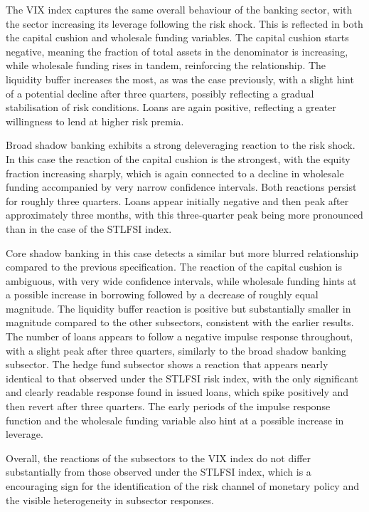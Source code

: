 \documentclass[12pt,a4paper]{report}
\begin{document}
The VIX index captures the same overall behaviour of the banking sector, with the sector increasing its leverage following the risk shock. This is reflected in both the capital cushion and wholesale funding variables. The capital cushion starts negative, meaning the fraction of total assets in the denominator is increasing, while wholesale funding rises in tandem, reinforcing the relationship. The liquidity buffer increases the most, as was the case previously, with a slight hint of a potential decline after three quarters, possibly reflecting a gradual stabilisation of risk conditions. Loans are again positive, reflecting a greater willingness to lend at higher risk premia.

Broad shadow banking exhibits a strong deleveraging reaction to the risk shock. In this case the reaction of the capital cushion is the strongest, with the equity fraction increasing sharply, which is again connected to a decline in wholesale funding accompanied by very narrow confidence intervals. Both reactions persist for roughly three quarters. Loans appear initially negative and then peak after approximately three months, with this three-quarter peak being more pronounced than in the case of the STLFSI index.

Core shadow banking in this case detects a similar but more blurred relationship compared to the previous specification. The reaction of the capital cushion is ambiguous, with very wide confidence intervals, while wholesale funding hints at a possible increase in borrowing followed by a decrease of roughly equal magnitude. The liquidity buffer reaction is positive but substantially smaller in magnitude compared to the other subsectors, consistent with the earlier results. The number of loans appears to follow a negative impulse response throughout, with a slight peak after three quarters, similarly to the broad shadow banking subsector.
The hedge fund subsector shows a reaction that appears nearly identical to that observed under the STLFSI risk index, with the only significant and clearly readable response found in issued loans, which spike positively and then revert after three quarters. The early periods of the impulse response function and the wholesale funding variable also hint at a possible increase in leverage.

Overall, the reactions of the subsectors to the VIX index do not differ substantially from those observed under the STLFSI index, which is a encouraging sign for the identification of the risk channel of monetary policy and the visible heterogeneity in subsector responses.
\end{document}
